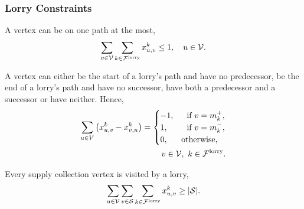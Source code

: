 %
%
%


\subsubsection{Lorry Constraints}


A vertex can be on one path at the most,
\begin{align}
\label{con:first}
 \sum_{v \in \mathcal V}
 \sum_{k \in \mathcal F^{\rm lorry}}
 x^k_{u,v} \leq 1, \quad  u \in  \mathcal V  .
\end{align}

A vertex can either  be the start of a lorry's path and have no predecessor,    be the end of a lorry's path and have no successor,  have both a predecessor and a successor or have neither.
Hence,
\begin{align}
  \sum_{u \in  V }
  \left( x^k_{u,v} -  x^k_{v,u} \right) =
  \begin{cases}
    -1,  & \ \text{ if } v = m^+_k, \\
    1, & \ \text{ if } v = m^-_k, \\
    0,  & \text{otherwise,}
  \end{cases} \\
  \quad v \in  \mathcal V , \ k \in \mathcal F^{\rm lorry}. \notag
\end{align}

Every supply collection vertex
is visited by a lorry,
\begin{align}
  \label{con:customer_served}
   \sum_{u \in \mathcal V}
   \sum_{v \in \mathcal S}
   \sum_{k \in \mathcal F^{\rm lorry}}
x^k_{u,v} \geq |\mathcal S| .
\end{align}
\\


